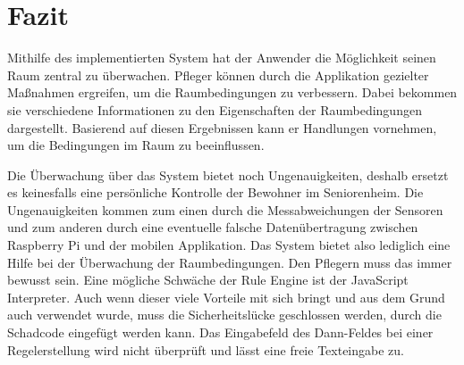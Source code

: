 \chapter{Fazit}

Mithilfe des implementierten System hat der Anwender die Möglichkeit seinen Raum zentral zu überwachen. Pfleger können durch die Applikation gezielter Maßnahmen ergreifen, um die Raumbedingungen zu verbessern. Dabei bekommen sie verschiedene Informationen zu den Eigenschaften der Raumbedingungen dargestellt. Basierend auf diesen Ergebnissen kann er Handlungen vornehmen, um die Bedingungen im Raum zu beeinflussen.
 
Die Überwachung über das System bietet noch Ungenauigkeiten, deshalb ersetzt es keinesfalls eine persönliche Kontrolle der Bewohner im Seniorenheim. Die Ungenauigkeiten kommen zum einen durch die Messabweichungen der Sensoren und zum anderen durch eine eventuelle falsche Datenübertragung zwischen Raspberry Pi und der mobilen Applikation. Das System bietet also lediglich eine Hilfe bei der Überwachung der Raumbedingungen. Den Pflegern muss das immer bewusst sein.
Eine mögliche Schwäche der Rule Engine ist der JavaScript Interpreter. Auch wenn dieser viele Vorteile mit sich bringt und aus dem Grund auch verwendet wurde, muss die Sicherheitslücke geschlossen werden, durch die Schadcode eingefügt werden kann. Das Eingabefeld des Dann-Feldes bei einer Regelerstellung wird nicht überprüft und lässt eine freie Texteingabe zu. 